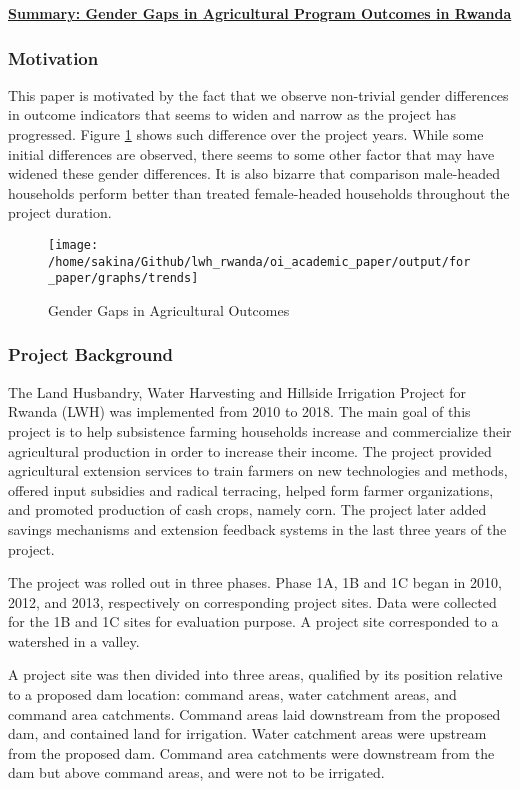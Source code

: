 \documentclass[12pt]{article}
\begin{document}
\textbf{\underline{Summary: Gender Gaps in Agricultural Program Outcomes in Rwanda}} 

\subsubsection*{\textbf{Motivation}}
	This paper is motivated by the fact that we observe non-trivial gender differences in outcome indicators that seems to widen and narrow as the project has progressed. Figure \ref{fig:desc_trends} shows such difference over the project years. While some initial differences are observed, there seems to some other factor that may have widened these gender differences. It is also bizarre that comparison male-headed households perform better than treated female-headed households throughout the project duration. 
	
	\begin{figure}[H]
		\centering
		\caption{Gender Gaps in Agricultural Outcomes}
		\vspace{3mm}	
		\texttt{[image: /home/sakina/Github/lwh\_rwanda/oi\_academic\_paper/output/for\_paper/graphs/trends]}
		\label{fig:desc_trends}
	\end{figure}
	
\subsubsection*{Project Background}
	The Land Husbandry, Water Harvesting and Hillside Irrigation Project for Rwanda (LWH) was implemented from 2010 to 2018. The main goal of this project is to help subsistence farming households increase and commercialize their agricultural production in order to increase their income. The project provided agricultural extension services to train farmers on new technologies and methods, offered input subsidies and radical terracing, helped form farmer organizations, and promoted production of cash crops, namely corn. The project later added savings mechanisms and extension feedback systems in the last three years of the project. 
	
	 The project was rolled out in three phases. Phase 1A, 1B and 1C began in 2010, 2012, and 2013, respectively on corresponding project sites. Data were collected for the 1B and 1C sites for evaluation purpose. A project site corresponded to a watershed in a valley. 
	
	A project site was then divided into three areas, qualified by its position relative to a proposed dam location: command areas, water catchment areas, and command area catchments. Command areas laid downstream from the proposed dam, and contained land for irrigation. Water catchment areas were upstream from the proposed dam. Command area catchments were downstream from the dam but above command areas, and were not to be irrigated. 
 
\end{document}
